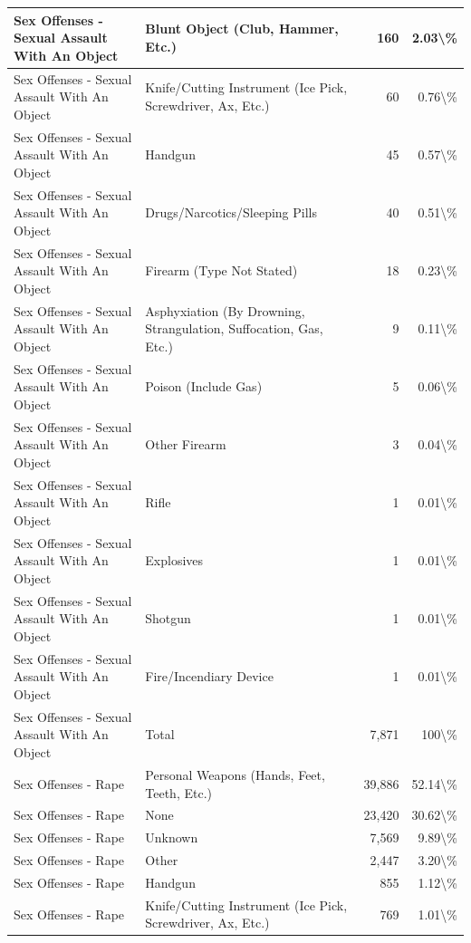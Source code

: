 \documentclass[
]{krantz}
\begin{document}
\begin{longtable}[t]{l|l|r|r}
\hline
Sex Offenses - Sexual Assault With An Object & Blunt Object (Club, Hammer, Etc.) & 160 & 2.03\textbackslash{}\%\\
\hline
Sex Offenses - Sexual Assault With An Object & Knife/Cutting Instrument (Ice Pick, Screwdriver, Ax, Etc.) & 60 & 0.76\textbackslash{}\%\\
\hline
Sex Offenses - Sexual Assault With An Object & Handgun & 45 & 0.57\textbackslash{}\%\\
\hline
Sex Offenses - Sexual Assault With An Object & Drugs/Narcotics/Sleeping Pills & 40 & 0.51\textbackslash{}\%\\
\hline
Sex Offenses - Sexual Assault With An Object & Firearm (Type Not Stated) & 18 & 0.23\textbackslash{}\%\\
\hline
Sex Offenses - Sexual Assault With An Object & Asphyxiation (By Drowning, Strangulation, Suffocation, Gas, Etc.) & 9 & 0.11\textbackslash{}\%\\
\hline
Sex Offenses - Sexual Assault With An Object & Poison (Include Gas) & 5 & 0.06\textbackslash{}\%\\
\hline
Sex Offenses - Sexual Assault With An Object & Other Firearm & 3 & 0.04\textbackslash{}\%\\
\hline
Sex Offenses - Sexual Assault With An Object & Rifle & 1 & 0.01\textbackslash{}\%\\
\hline
Sex Offenses - Sexual Assault With An Object & Explosives & 1 & 0.01\textbackslash{}\%\\
\hline
Sex Offenses - Sexual Assault With An Object & Shotgun & 1 & 0.01\textbackslash{}\%\\
\hline
Sex Offenses - Sexual Assault With An Object & Fire/Incendiary Device & 1 & 0.01\textbackslash{}\%\\
\hline
Sex Offenses - Sexual Assault With An Object & Total & 7,871 & 100\textbackslash{}\%\\
\hline
Sex Offenses - Rape & Personal Weapons (Hands, Feet, Teeth, Etc.) & 39,886 & 52.14\textbackslash{}\%\\
\hline
Sex Offenses - Rape & None & 23,420 & 30.62\textbackslash{}\%\\
\hline
Sex Offenses - Rape & Unknown & 7,569 & 9.89\textbackslash{}\%\\
\hline
Sex Offenses - Rape & Other & 2,447 & 3.20\textbackslash{}\%\\
\hline
Sex Offenses - Rape & Handgun & 855 & 1.12\textbackslash{}\%\\
\hline
Sex Offenses - Rape & Knife/Cutting Instrument (Ice Pick, Screwdriver, Ax, Etc.) & 769 & 1.01\textbackslash{}\%\\

\end{longtable}
\end{document}
